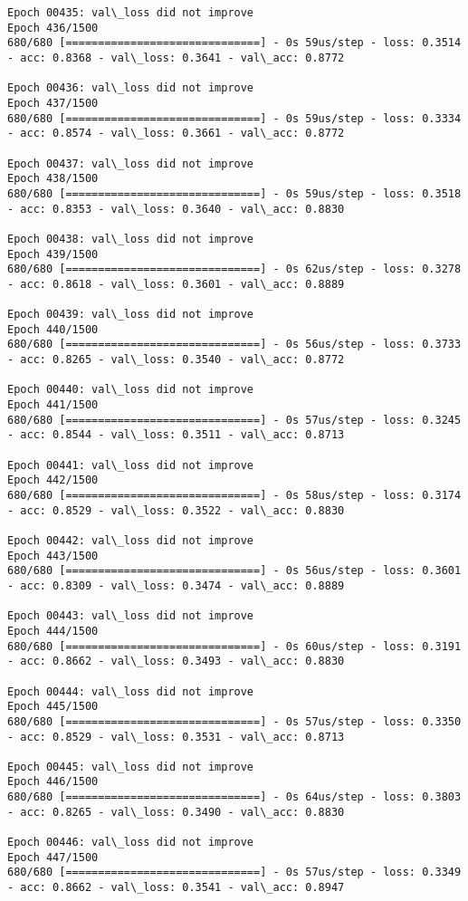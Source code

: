 \documentclass[11pt]{article}
\begin{document}
\begin{Verbatim}[commandchars=\\\{\}]
Epoch 00435: val\_loss did not improve
Epoch 436/1500
680/680 [==============================] - 0s 59us/step - loss: 0.3514 - acc: 0.8368 - val\_loss: 0.3641 - val\_acc: 0.8772

Epoch 00436: val\_loss did not improve
Epoch 437/1500
680/680 [==============================] - 0s 59us/step - loss: 0.3334 - acc: 0.8574 - val\_loss: 0.3661 - val\_acc: 0.8772

Epoch 00437: val\_loss did not improve
Epoch 438/1500
680/680 [==============================] - 0s 59us/step - loss: 0.3518 - acc: 0.8353 - val\_loss: 0.3640 - val\_acc: 0.8830

Epoch 00438: val\_loss did not improve
Epoch 439/1500
680/680 [==============================] - 0s 62us/step - loss: 0.3278 - acc: 0.8618 - val\_loss: 0.3601 - val\_acc: 0.8889

Epoch 00439: val\_loss did not improve
Epoch 440/1500
680/680 [==============================] - 0s 56us/step - loss: 0.3733 - acc: 0.8265 - val\_loss: 0.3540 - val\_acc: 0.8772

Epoch 00440: val\_loss did not improve
Epoch 441/1500
680/680 [==============================] - 0s 57us/step - loss: 0.3245 - acc: 0.8544 - val\_loss: 0.3511 - val\_acc: 0.8713

Epoch 00441: val\_loss did not improve
Epoch 442/1500
680/680 [==============================] - 0s 58us/step - loss: 0.3174 - acc: 0.8529 - val\_loss: 0.3522 - val\_acc: 0.8830

Epoch 00442: val\_loss did not improve
Epoch 443/1500
680/680 [==============================] - 0s 56us/step - loss: 0.3601 - acc: 0.8309 - val\_loss: 0.3474 - val\_acc: 0.8889

Epoch 00443: val\_loss did not improve
Epoch 444/1500
680/680 [==============================] - 0s 60us/step - loss: 0.3191 - acc: 0.8662 - val\_loss: 0.3493 - val\_acc: 0.8830

Epoch 00444: val\_loss did not improve
Epoch 445/1500
680/680 [==============================] - 0s 57us/step - loss: 0.3350 - acc: 0.8529 - val\_loss: 0.3531 - val\_acc: 0.8713

Epoch 00445: val\_loss did not improve
Epoch 446/1500
680/680 [==============================] - 0s 64us/step - loss: 0.3803 - acc: 0.8265 - val\_loss: 0.3490 - val\_acc: 0.8830

Epoch 00446: val\_loss did not improve
Epoch 447/1500
680/680 [==============================] - 0s 57us/step - loss: 0.3349 - acc: 0.8662 - val\_loss: 0.3541 - val\_acc: 0.8947


\end{Verbatim}
\end{document}
